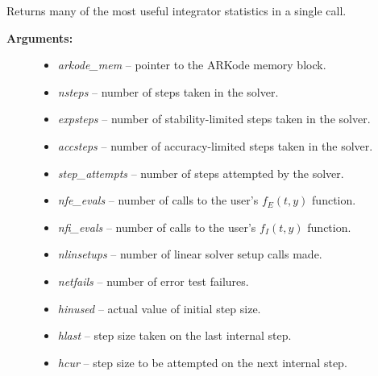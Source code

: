 \documentclass[letterpaper,10pt,english]{sphinxmanual}
\begin{document}
\begin{fulllineitems}
\label{c_interface/User_callable:ARKodeGetIntegratorStats}
Returns many of the most useful integrator statistics in a single call.
\begin{description}
\item[{\textbf{Arguments:}}] \leavevmode\begin{itemize}
\item {} 
\emph{arkode\_mem} -- pointer to the ARKode memory block.

\item {} 
\emph{nsteps} -- number of steps taken in the solver.

\item {} 
\emph{expsteps} -- number of stability-limited steps taken in the solver.

\item {} 
\emph{accsteps} -- number of accuracy-limited steps taken in the solver.

\item {} 
\emph{step\_attempts} -- number of steps attempted by the solver.

\item {} 
\emph{nfe\_evals} -- number of calls to the user's $f_E(t,y)$ function.

\item {} 
\emph{nfi\_evals} -- number of calls to the user's $f_I(t,y)$ function.

\item {} 
\emph{nlinsetups} -- number of linear solver setup calls made.

\item {} 
\emph{netfails} -- number of error test failures.

\item {} 
\emph{hinused} -- actual value of initial step size.

\item {} 
\emph{hlast} -- step size taken on the last internal step.

\item {} 
\emph{hcur} -- step size to be attempted on the next internal step.


\end{itemize}
\end{description}
\end{fulllineitems}
\end{document}
